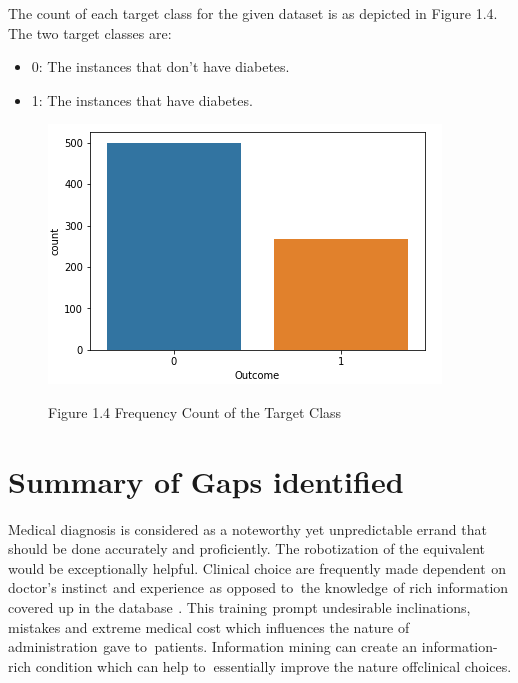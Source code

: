\documentclass[oneside,12pt]{Classes/VTU}
\begin{document}
	\pagebreak
	The count of each target class for the given dataset is as depicted in Figure 1.4.
	\\
	The two target classes are:
	\begin{itemize}
		\item 0: The instances that don’t have diabetes.
		\item 1: The instances that have diabetes.
	\end{itemize}

	\begin{figure}	
		\begin{center}
			\includegraphics[scale=0.6]{images/diabetescount.png}
		\end{center}
		\begin{center}
			Figure 1.4 Frequency Count of the Target Class
		\end{center}
	\end{figure}
    
 
    
   \section{Summary of Gaps identified}
   Medical diagnosis is considered as a noteworthy yet unpredictable errand that should be done accurately and proficiently. The robotization of the equivalent would be exceptionally helpful. Clinical choice are frequently made dependent\tiny\textcolor{white}{s}\normalsize on doctor's instinct\tiny\textcolor{white}{s}\normalsize and experience\tiny\textcolor{white}{s}\normalsize as opposed to\tiny\textcolor{white}{o}\normalsize the knowledge\tiny\textcolor{white}{s}\normalsize of rich information covered up in the database\tiny\textcolor{white}{s}\normalsize. This training\tiny\textcolor{white}{s}\normalsize prompt undesirable inclinations, mistakes and extreme medical cost which influences the nature of administration\tiny\textcolor{white}{s}\normalsize gave to\tiny\textcolor{white}{o}\normalsize patients. Information mining can create an information-rich condition which can help to\tiny\textcolor{white}{o}\normalsize essentially improve the nature of\tiny\textcolor{white}{f}\normalsize clinical choices.
   
\end{document}
